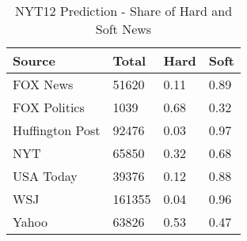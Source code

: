 
\begin{table}[t]

\caption{\label{tab:tab:nyt12_pred_hard_soft}NYT12 Prediction - Share of Hard and Soft News}
\centering
\begin{tabular}{llll}
\toprule
Source & Total & Hard & Soft\\
\midrule
FOX News & 51620 & 0.11 & 0.89\\
FOX Politics & 1039 & 0.68 & 0.32\\
Huffington Post & 92476 & 0.03 & 0.97\\
NYT & 65850 & 0.32 & 0.68\\
USA Today & 39376 & 0.12 & 0.88\\
\addlinespace
WSJ & 161355 & 0.04 & 0.96\\
Yahoo & 63826 & 0.53 & 0.47\\
\bottomrule
\end{tabular}
\end{table}

